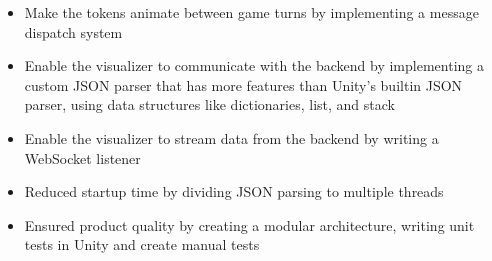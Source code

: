 
\begin{itemize}
  \item Make the tokens animate between game turns by implementing a message
  dispatch system
  \item Enable the visualizer to communicate with the backend by implementing
  a custom JSON parser that has more features than Unity's builtin JSON parser,
  using data structures like dictionaries, list, and stack
  \item Enable the visualizer to stream data from the backend by writing a
  WebSocket listener
  \item Reduced startup time by dividing JSON parsing to multiple threads
  \item Ensured product quality by creating a modular architecture, writing
  unit tests in Unity and create manual tests
\end{itemize}
